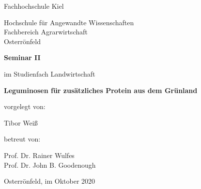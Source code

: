 
\begin{titlepage}
\centering

\begingroup
    \Large{Fachhochschule Kiel}
    \par
\endgroup

\begingroup
    \large{Hochschule für Angewandte Wissenschaften \\
        Fachbereich Agrarwirtschaft \\
        Osterrönfeld}
    \par
\endgroup


\vspace{3cm}


\begingroup
    \Large
    \bfseries{Seminar II}
    \par
\endgroup

\vspace{0.1cm}

im Studienfach Landwirtschaft

\vspace{2cm}

\hrulefill

\vspace{0.5cm}
\begingroup
    \LARGE
    \bfseries{Leguminosen für zusätzliches Protein aus dem Grünland}
    \par
\endgroup
\vspace{0.5cm}
\hrulefill
\vspace{2cm}

vorgelegt von:

\begingroup
    \large{Tibor Weiß}
    \par
\endgroup

\vspace{1.5cm}

betreut von:

\begingroup
    \large{Prof. Dr. Rainer Wulfes \\
        Prof. Dr. John B. Goodenough}
    \par
\endgroup

\vspace{2cm}

Osterrönfeld, im Oktober 2020

\end{titlepage}
